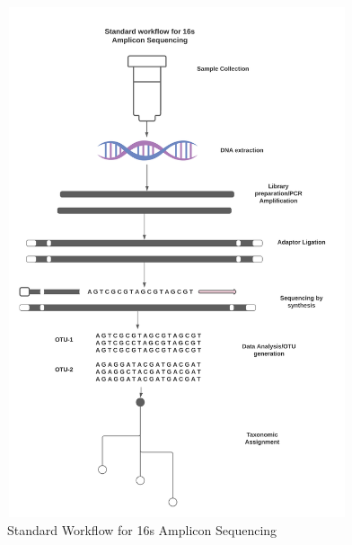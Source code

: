 \begin{figure}[!hb]
  \centering
  \includegraphics[width=10cm, height=15cm]{../figures/Figure3.png}
  \caption{Standard Workflow for 16s Amplicon Sequencing}
  \label{fig:figure3}
\end{figure}

